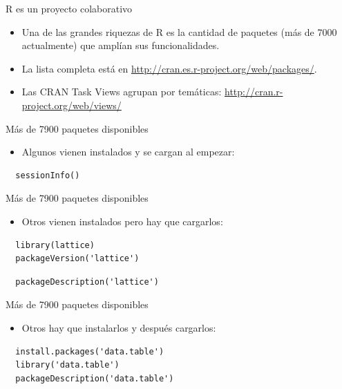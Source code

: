 \documentclass[xcolor={usenames,svgnames,dvipsnames}]{beamer}
\begin{document}
\begin{frame}[label={sec:orgheadline13}]{R es un proyecto colaborativo}
\begin{itemize}
\item Una de las grandes riquezas de R es la cantidad de paquetes (más
de 7000 actualmente) que amplían sus funcionalidades.
\item La lista completa está en \url{http://cran.es.r-project.org/web/packages/}.
\item Las CRAN Task Views agrupan por temáticas:
\url{http://cran.r-project.org/web/views/}
\end{itemize}
\end{frame}

\begin{frame}[fragile,label={sec:orgheadline14}]{Más de 7900 paquetes disponibles}
 \begin{itemize}
\item Algunos vienen instalados y se cargan al empezar:
\end{itemize}
\lstset{language=R,label= ,caption= ,captionpos=b,numbers=none}
\begin{lstlisting}
  sessionInfo()
\end{lstlisting}
\end{frame}
\begin{frame}[fragile,label={sec:orgheadline15}]{Más de 7900 paquetes disponibles}
 \begin{itemize}
\item Otros vienen instalados pero hay que cargarlos:
\end{itemize}
\lstset{language=R,label= ,caption= ,captionpos=b,numbers=none}
\begin{lstlisting}
  library(lattice)
  packageVersion('lattice')
\end{lstlisting}
\lstset{language=R,label= ,caption= ,captionpos=b,numbers=none}
\begin{lstlisting}
  packageDescription('lattice')
\end{lstlisting}
\end{frame}

\begin{frame}[fragile,label={sec:orgheadline16}]{Más de 7900 paquetes disponibles}
 \begin{itemize}
\item Otros hay que instalarlos y después cargarlos:
\end{itemize}
\lstset{language=R,label= ,caption= ,captionpos=b,numbers=none}
\begin{lstlisting}
  install.packages('data.table')
  library('data.table')
  packageDescription('data.table')
\end{lstlisting}
\end{frame}
\end{document}
